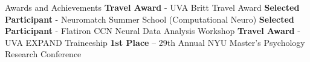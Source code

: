 \begin{rubric}{Awards and Achievements}
\entry*[Oct 2026]
\textbf{Travel Award} - UVA Britt Travel Award
\entry*[Jul 2026]
\textbf{Selected Participant} - Neuromatch Summer School (Computational Neuro)
\entry*[Feb 2026]
\textbf{Selected Participant} - Flatiron CCN Neural Data Analysis Workshop
\entry*[Dec 2025]
\textbf{Travel Award} - UVA EXPAND Traineeship
\entry*[Apr 2025]
\textbf{1st Place} -- 29th Annual NYU Master's Psychology Research Conference
\end{rubric}
